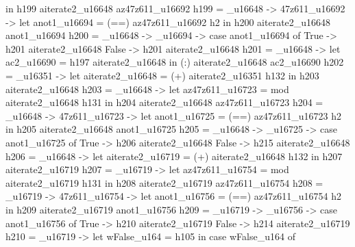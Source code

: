                                      in h199 aiterate2_u16648 az47z611_u16692
         h199 = _u16648 -> \az47z611_u16692 -> let
                                                           anot1_u16694 = (==) az47z611_u16692 h2
                                                         in h200 aiterate2_u16648 anot1_u16694
         h200 = _u16648 -> _u16694 -> case anot1_u16694 of
                                                        True -> h201 aiterate2_u16648
                                                        False -> h201 aiterate2_u16648
         h201 = _u16648 -> let ac2_u16690 = h197 aiterate2_u16648
                                     in (:) aiterate2_u16648 ac2_u16690
         h202 = _u16351 -> let
                                       aiterate2_u16648 = (+) aiterate2_u16351 h132
                                     in h203 aiterate2_u16648
         h203 = _u16648 -> let
                                       az47z611_u16723 = mod aiterate2_u16648 h131
                                     in h204 aiterate2_u16648 az47z611_u16723
         h204 = _u16648 -> \az47z611_u16723 -> let
                                                           anot1_u16725 = (==) az47z611_u16723 h2
                                                         in h205 aiterate2_u16648 anot1_u16725
         h205 = _u16648 -> _u16725 -> case anot1_u16725 of
                                                        True -> h206 aiterate2_u16648
                                                        False -> h215 aiterate2_u16648
         h206 = _u16648 -> let
                                       aiterate2_u16719 = (+) aiterate2_u16648 h132
                                     in h207 aiterate2_u16719
         h207 = _u16719 -> let
                                       az47z611_u16754 = mod aiterate2_u16719 h131
                                     in h208 aiterate2_u16719 az47z611_u16754
         h208 = _u16719 -> \az47z611_u16754 -> let
                                                           anot1_u16756 = (==) az47z611_u16754 h2
                                                         in h209 aiterate2_u16719 anot1_u16756
         h209 = _u16719 -> _u16756 -> case anot1_u16756 of
                                                        True -> h210 aiterate2_u16719
                                                        False -> h214 aiterate2_u16719
         h210 = _u16719 -> let wFalse_u164 = h105
                                     in case wFalse_u164 of
